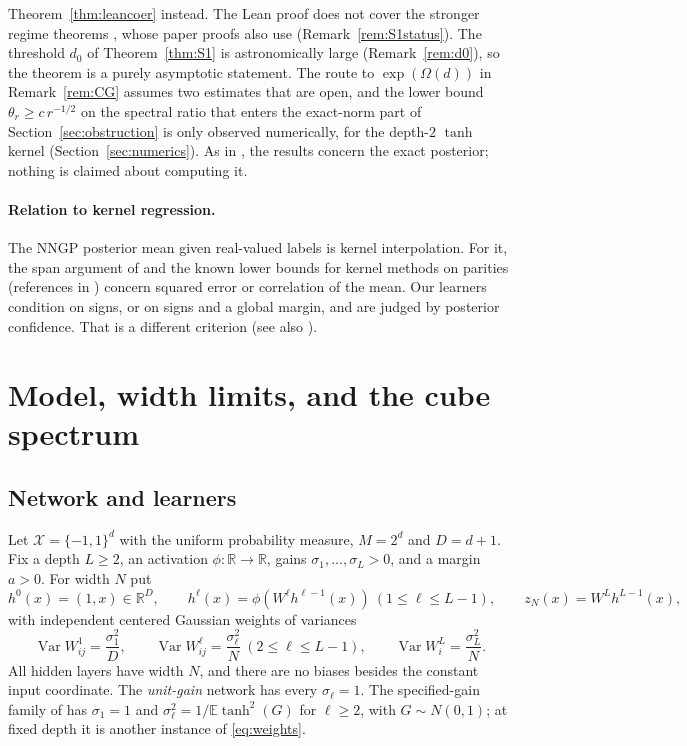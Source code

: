 \documentclass[11pt]{article}
\theoremstyle{definition}\newtheorem{assumption}[theorem]{Assumption}
\theoremstyle{remark}\newtheorem{remark}[theorem]{Remark}
\DeclareMathOperator{\Var}{Var}
\newcommand{\E}{\mathbb E}
\newcommand{\X}{\mathcal X}
\newcommand{\R}{\mathbb R}
\begin{document}
Theorem~\ref{thm:leancoer} instead. The Lean proof does not cover the
stronger regime theorems \cite[Theorems~9.2 and~10.2]{subcritical}, whose
paper proofs also use \cite[Lemma~4.1]{subcritical}
(Remark~\ref{rem:S1status}). The threshold $d_0$ of
Theorem~\ref{thm:S1} is astronomically large (Remark~\ref{rem:d0}), so the
theorem is a purely asymptotic statement. The route to $\exp(\Omega(d))$
in Remark~\ref{rem:CG} assumes two estimates that are open, and the lower
bound $\theta_r\ge c\,r^{-1/2}$ on the spectral ratio that enters the
exact-norm part of Section~\ref{sec:obstruction} is only observed
numerically, for the depth-$2$ $\tanh$ kernel (Section~\ref{sec:numerics}).
As in
\cite{nngpnote,subcritical}, the results concern the exact posterior;
nothing is claimed about computing it.

\paragraph{Relation to kernel regression.} The NNGP posterior mean given
real-valued labels is kernel interpolation. For it, the span argument of
\cite[Proposition~4.1]{nngpnote} and the known lower bounds for kernel
methods on parities (references in \cite{beyondparity}) concern squared
error or correlation of the mean. Our learners condition on signs, or on signs and a global margin, and
are judged by posterior confidence. That is a different criterion
(see also \cite[Section~5]{nngpnote}).

\section{Model, width limits, and the cube spectrum}
\label{sec:model}
\subsection{Network and learners}
Let $\X=\{-1,1\}^d$ with the uniform probability measure, $M=2^d$ and
$D=d+1$. Fix a depth $L\ge2$, an activation $\phi:\R\to\R$, gains
$\sigma_1,\ldots,\sigma_L>0$, and a margin $a>0$. For width $N$ put
\[
 h^0(x)=(1,x)\in\R^D,\qquad h^\ell(x)=\phi(W^\ell h^{\ell-1}(x))
 \ (1\le\ell\le L-1),\qquad z_N(x)=W^Lh^{L-1}(x),
\]
with independent centered Gaussian weights of variances
\begin{equation}\label{eq:weights}
 \Var W^1_{ij}=\frac{\sigma_1^2}{D},\qquad
 \Var W^\ell_{ij}=\frac{\sigma_\ell^2}N\ (2\le\ell\le L-1),\qquad
 \Var W^L_i=\frac{\sigma_L^2}N .
\end{equation}
All hidden layers have width $N$, and there are no biases besides the
constant input coordinate. The \emph{unit-gain} network has every
$\sigma_\ell=1$. The specified-gain family of \cite[Section~7]{nngpnote}
has $\sigma_1=1$ and $\sigma_\ell^2=1/\E\tanh^2(G)$ for $\ell\ge2$, with
$G\sim N(0,1)$; at fixed depth it is another instance of
\eqref{eq:weights}.
\end{document}
